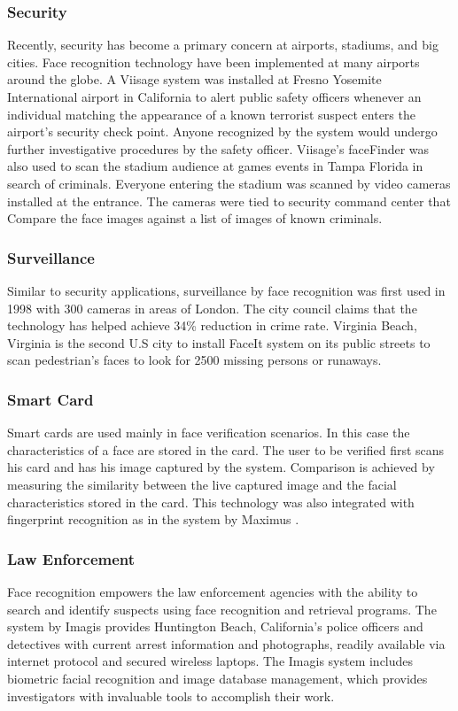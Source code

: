 \subsubsection{Security}
Recently, security has become a primary concern at airports,
stadiums, and big cities. Face recognition technology have been
implemented at many airports around the globe. A Viisage system
\cite{viisage} was installed at Fresno Yosemite International
airport in California to alert public safety officers whenever an
individual matching the appearance of a known terrorist suspect
enters the airport's security check point. Anyone recognized by the
system would undergo further investigative procedures by the safety
officer. Viisage's faceFinder was also used to scan the stadium
audience at games events in Tampa Florida in search of criminals.
Everyone entering the stadium was scanned by video cameras installed
at the entrance. The cameras were tied to security command center
that Compare the face images against a list of images of known
criminals.

\subsubsection{Surveillance}
Similar to security applications, surveillance by face recognition
was first used in 1998 with 300 cameras in areas of London. The city
council claims that the technology has helped achieve 34\% reduction
in crime rate. Virginia Beach, Virginia is the second U.S city to
install FaceIt system on its public streets to scan pedestrian's
faces to look for 2500 missing persons or runaways.

\subsubsection{Smart Card}
Smart cards are used mainly in face verification scenarios. In this
case the characteristics of a face are stored in the card. The user
to be verified first scans his card and has his image captured by
the system. Comparison is achieved by measuring the similarity
between the live captured image and the facial characteristics
stored in the card. This technology was also integrated with
fingerprint recognition as in the system by Maximus \cite{maximus}.

\subsubsection{Law Enforcement}
Face recognition empowers the law enforcement agencies with the
ability to search and identify suspects using face recognition and
retrieval programs. The system by Imagis \cite{imagistechnologies}
provides Huntington Beach, California's police officers and
detectives with current arrest information and photographs, readily
available via internet protocol and secured wireless laptops. The
Imagis system includes biometric facial recognition and image
database management, which provides investigators with invaluable
tools to accomplish their work.

